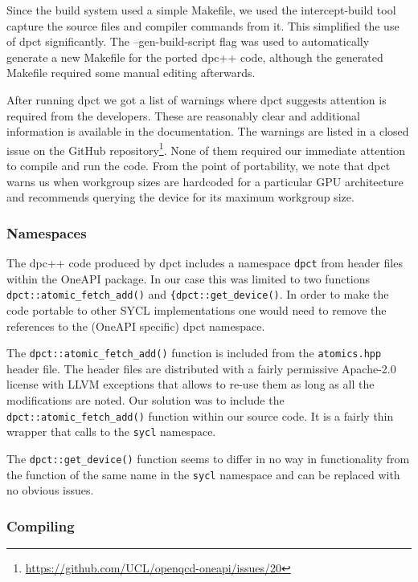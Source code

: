 \documentclass[../main]{subfiles}
\begin{document}
Since the build system used a simple Makefile, we used the intercept-build tool capture the source files and compiler commands from it.
This simplified the use of dpct significantly.
The --gen-build-script flag was used to automatically generate a new Makefile for the ported dpc++ code, although the generated Makefile required some manual editing afterwards.

After running dpct we got a list of warnings where dpct suggests attention is required from the developers.
These are reasonably clear and additional information is available in the documentation.
The warnings are listed in a closed issue on the GitHub repository\footnote{\url{https://github.com/UCL/openqcd-oneapi/issues/20}}.
None of them required our immediate attention to compile and run the code.
From the point of portability, we note that dpct warns us when workgroup sizes are hardcoded for a particular GPU architecture and recommends querying the device for its maximum workgroup size.

\subsubsection{Namespaces}\label{sec:openqcd_namespaces}

The dpc++ code produced by dpct includes a namespace \texttt{dpct} from header files within the OneAPI package.
In our case this was limited to two functions \verb!dpct::atomic_fetch_add()! and \verb!{dpct::get_device()!.
In order to make the code portable to other SYCL implementations one would need to remove the references to the (OneAPI specific) dpct namespace.

The \verb!dpct::atomic_fetch_add()! function is included from the \texttt{atomics.hpp} header file.
The header files are distributed with a fairly permissive Apache-2.0 license with LLVM exceptions that allows to re-use them as long as all the modifications are noted.
Our solution was to include the \verb!dpct::atomic_fetch_add()! function within our source code.
It is a fairly thin wrapper that calls to the \texttt{sycl} namespace.

The \verb!dpct::get_device()! function seems to differ in no way in functionality from the function of the same name in the \texttt{sycl} namespace and can be replaced with no obvious issues.

\subsubsection{Compiling}\label{sec:openqcd_compiling}
\end{document}
